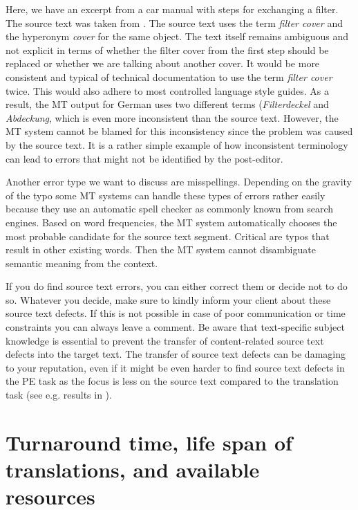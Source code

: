 Here, we have an excerpt from a car manual with steps for exchanging a filter. The source text was taken from \citet[91]{schmitt1999translation}. The source text uses the term \textit{filter cover} and the hyperonym \textit{cover} for the same object. The text itself remains ambiguous and not explicit in terms of whether the filter cover from the first step should be replaced or whether we are talking about another cover. It would be more consistent and typical of technical documentation to use the term \textit{filter cover} twice. This would also adhere to most controlled language style guides. As a result, the MT output for German uses two different terms (\textit{Filterdeckel} and \textit{Abdeckung}, which is even more inconsistent than the source text. However, the MT system cannot be blamed for this inconsistency since the problem was caused by the source text. It is a rather simple example of how inconsistent terminology can lead to errors that might not be identified by the post-editor.

Another error type we want to discuss are misspellings. Depending on the gravity of the typo some MT systems can handle these types of errors rather easily because they use an automatic spell checker as commonly known from search engines. Based on word frequencies, the MT system automatically chooses the most probable candidate for the source text segment. Critical are typos that result in other existing words. Then the MT system cannot disambiguate semantic meaning from the context. 

If you do find source text errors, you can either correct them or decide not to do so. Whatever you decide, make sure to kindly inform your client about these source text defects. If this is not possible in case of poor communication or time constraints you can always leave a comment. Be aware that text-specific subject knowledge is essential to prevent the transfer of content-related source text defects into the target text. The transfer of source text defects can be damaging to your reputation, even if it might be even harder to find source text defects in the PE task as the focus is less on the source text compared to the translation task (see e.g. results in \citealt{nitzke_comparing_2016}).

\section{Turnaround time, life span of translations, and available resources}\label{sec:8:3}

